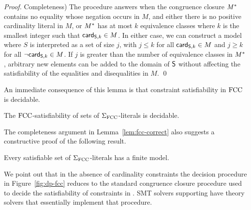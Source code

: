 \documentclass{svjour3}                     %
\begin{document}
\begin{proof}
Completeness)
The procedure answers \sat 
when the congruence closure $\cc M$ contains no equality whose negation occurs in $M$, 
and either there is no positive cardinality literal in $M$,
or $\cc M$ has at most $k$ equivalence classes
where $k$ is the smallest integer such that $\card[\So,k] \in M$.
In either case, we can construct a model where $S$ is interpreted 
as a set of size $j$, with $j \leq k$ for all $\card[\So,k] \in M$
and $j \geq k$ for all $\neg \card[\So,k] \in M$.
If $j$ is greater than the number of equivalence classes in $\cc M$,
arbitrary new elements can be added to the domain of $\So$
without affecting the satisfiability of the equalities and disequalities in $M$.
\qed
\end{proof}
\medskip

An immediate consequence of this lemma is that constraint satisfiability in $\fcc$ is decidable.

\begin{proposition}
The $\fcc$-satisfiability of sets of $\Sigma_\fcc$-literals is decidable.
\end{proposition}

The completeness argument in Lemma~\ref{lem:fcc-correct}
also suggests a constructive proof of the following result.
\begin{proposition}
\label{prop:fcc-finite}
Every satisfiable set of $\Sigma_\fcc$-literals has a finite model.
\end{proposition}


We point out that in the absence of cardinality constraints 
the decision procedure in Figure~\ref{fig:dp-fcc} reduces 
to the standard congruence closure procedure used to decide the satisfiability
of constraints in \euf.
SMT solvers supporting \euf have theory solvers that essentially implement 
that procedure.
\end{document}
